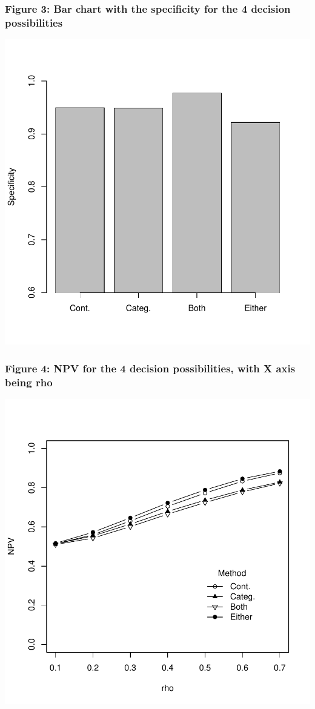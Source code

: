 \documentclass{article}
\begin{document}
\subsubsection*{Figure 3: Bar chart with the specificity for the 4 decision possibilities }



\includegraphics{accuracy_category_withrr-ff}

\subsubsection*{Figure 4: NPV for the 4 decision possibilities, with X axis being rho}


\includegraphics{accuracy_category_withrr-gg}
\end{document}
